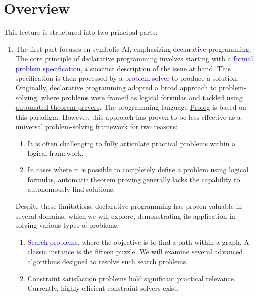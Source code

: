 \section{Overview}
This lecture is structured into two principal parts:
\begin{enumerate}
\item The first part focuses on symbolic AI, emphasizing \textcolor{blue}{declarative programming}. The
      core principle of declarative programming involves starting with a \textcolor{blue}{formal problem
        specification}, a succinct description of the issue at hand. This specification is then processed by a
      \textcolor{blue}{problem solver} to produce a solution. Originally,
      \href{https://en.wikipedia.org/wiki/Declarative_programming}{declarative programming} adopted a broad
      approach to problem-solving, where problems were framed as logical formulas and tackled using
      \href{https://en.wikipedia.org/wiki/Automated_theorem_proving}{automated theorem provers}. The
      programming language \href{https://en.wikipedia.org/wiki/Prolog}{Prolog} is based on this
      paradigm. However, this approach has proven to be less effective as a universal problem-solving framework
      for two reasons: 
      \begin{enumerate}
      \item It is often challenging to fully articulate practical problems within a logical framework.
      \item In cases where it is possible to completely define a problem using logical formulas, automatic
             theorem proving generally lacks the capability to autonomously find solutions. 
      \end{enumerate}
      Despite these limitations, declarative programming has proven valuable in several domains, which we will
      explore, demonstrating its application in solving various types of problems: 
      \begin{enumerate}
      \item \textcolor{blue}{Search problems}, where the objective is to find a path within a graph. A classic
            instance is the \href{https://en.wikipedia.org/wiki/15_puzzle}{fifteen puzzle}. We will examine several
            advanced algorithms designed to resolve such search problems. 
      \item \href{https://en.wikipedia.org/wiki/Constraint_satisfaction_problem}{Constraint satisfaction
            problems} hold significant practical relevance. Currently, highly efficient constraint solvers exist,

\end{enumerate}
\end{enumerate}

